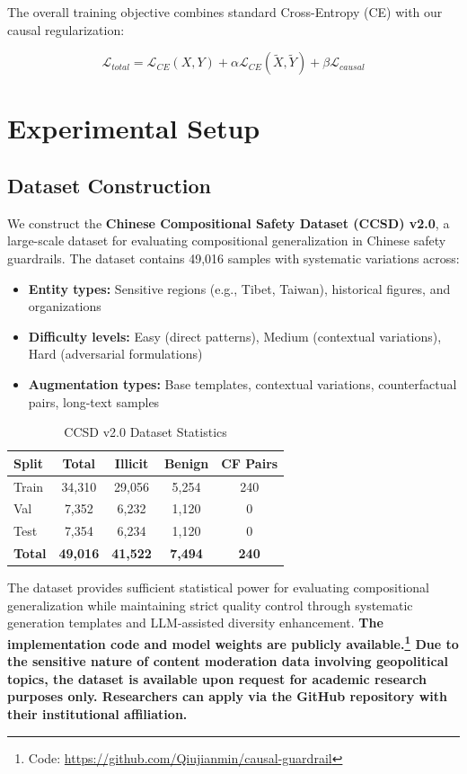\documentclass{acmart}
\begin{document}
The overall training objective combines standard Cross-Entropy (CE) with our causal regularization:

\begin{equation}
\label{eq:total_loss}
\mathcal{L}_{total} = \mathcal{L}_{CE}(X, Y) + \alpha \mathcal{L}_{CE}(\tilde{X}, \tilde{Y}) + \beta \mathcal{L}_{causal}
\end{equation}

\section{Experimental Setup}
\subsection{Dataset Construction}
We construct the \textbf{Chinese Compositional Safety Dataset (CCSD) v2.0}, a large-scale dataset for evaluating compositional generalization in Chinese safety guardrails. The dataset contains 49,016 samples with systematic variations across:
\begin{itemize}
\item \textbf{Entity types:} Sensitive regions (e.g., Tibet, Taiwan), historical figures, and organizations
\item \textbf{Difficulty levels:} Easy (direct patterns), Medium (contextual variations), Hard (adversarial formulations)
\item \textbf{Augmentation types:} Base templates, contextual variations, counterfactual pairs, long-text samples
\end{itemize}

\begin{table}[h]
\centering
\caption{CCSD v2.0 Dataset Statistics}
\begin{tabular}{lcccc}
\toprule
Split & Total & Illicit & Benign & CF Pairs \\
\midrule
Train & 34,310 & 29,056 & 5,254 & 240 \\
Val & 7,352 & 6,232 & 1,120 & 0 \\
Test & 7,354 & 6,234 & 1,120 & 0 \\
\midrule
\textbf{Total} & \textbf{49,016} & \textbf{41,522} & \textbf{7,494} & \textbf{240} \\
\bottomrule
\end{tabular}
\end{table}

The dataset provides sufficient statistical power for evaluating compositional generalization while maintaining strict quality control through systematic generation templates and LLM-assisted diversity enhancement. \textbf{The implementation code and model weights are publicly available.\footnote{Code: \url{https://github.com/Qiujianmin/causal-guardrail}} Due to the sensitive nature of content moderation data involving geopolitical topics, the dataset is available upon request for academic research purposes only. Researchers can apply via the GitHub repository with their institutional affiliation.}
\end{document}
